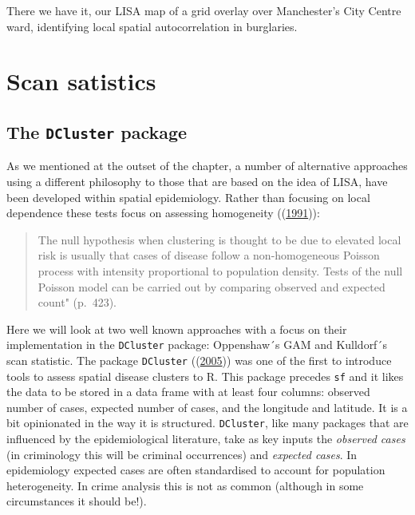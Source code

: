 \documentclass[
  krantz2]{krantz}
\begin{document}
There we have it, our LISA map of a grid overlay over Manchester's City Centre ward, identifying local spatial autocorrelation in burglaries.

\hypertarget{scan-satistics}{%
\section{Scan satistics}\label{scan-satistics}}

\hypertarget{the-dcluster-package}{%
\subsection{\texorpdfstring{The \texttt{DCluster} package}{The DCluster package}}\label{the-dcluster-package}}

As we mentioned at the outset of the chapter, a number of alternative approaches using a different philosophy to those that are based on the idea of LISA, have been developed within spatial epidemiology. Rather than focusing on local dependence these tests focus on assessing homogeneity ((\protect\hyperlink{ref-Marshall_1991}{1991})):

\begin{quote}
The null hypothesis when clustering is thought to be due to elevated local risk is usually that cases of disease follow a non-homogeneous Poisson process with intensity proportional to population density. Tests of the null Poisson model can be carried out by comparing observed and expected count" (p.~423).
\end{quote}

Here we will look at two well known approaches with a focus on their implementation in the \texttt{DCluster} package: Oppenshaw´s GAM and Kulldorf´s scan statistic. The package \texttt{DCluster} ((\protect\hyperlink{ref-Gomez_2005}{2005})) was one of the first to introduce tools to assess spatial disease clusters to R. This package precedes \texttt{sf} and it likes the data to be stored in a data frame with at least four columns: observed number of cases, expected number of cases, and the longitude and latitude. It is a bit opinionated in the way it is structured. \texttt{DCluster}, like many packages that are influenced by the epidemiological literature, take as key inputs the \emph{observed cases} (in criminology this will be criminal occurrences) and \emph{expected cases}. In epidemiology expected cases are often standardised to account for population heterogeneity. In crime analysis this is not as common (although in some circumstances it should be!).
\end{document}
